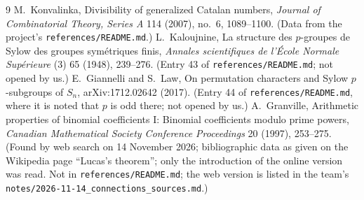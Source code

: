 \documentclass[11pt]{article}
\theoremstyle{definition}
\theoremstyle{remark}
\begin{document}
\begin{thebibliography}{9}\small
{} M.~Konvalinka, Divisibility of generalized Catalan numbers, \emph{Journal of Combinatorial Theory,
Series A} 114 (2007), no.~6, 1089--1100. (Data from the project's \texttt{references/README.md}.)
 L.~Kaloujnine, La structure des $p$-groupes de Sylow des groupes sym\'etriques finis, \emph{Annales
scientifiques de l'\'Ecole Normale Sup\'erieure} (3) 65 (1948), 239--276. (Entry 43 of \texttt{references/README.md}; not opened by us.)
 E.~Giannelli and S.~Law, On permutation characters and Sylow $p$-subgroups of $S_n$, arXiv:1712.02642 (2017).
(Entry 44 of \texttt{references/README.md}, where it is noted that $p$ is odd there; not opened by us.)
 A.~Granville, Arithmetic properties of binomial coefficients I: Binomial coefficients modulo prime
powers, \emph{Canadian Mathematical Society Conference Proceedings} 20 (1997), 253--275. (Found by web search on
14 November 2026; bibliographic data as given on the Wikipedia page ``Lucas's theorem''; only the introduction of the
online version was read. Not in \texttt{references/README.md}; the web version is listed in the team's
\texttt{notes/2026-11-14\_connections\_sources.md}.)
\end{thebibliography}
\end{document}
